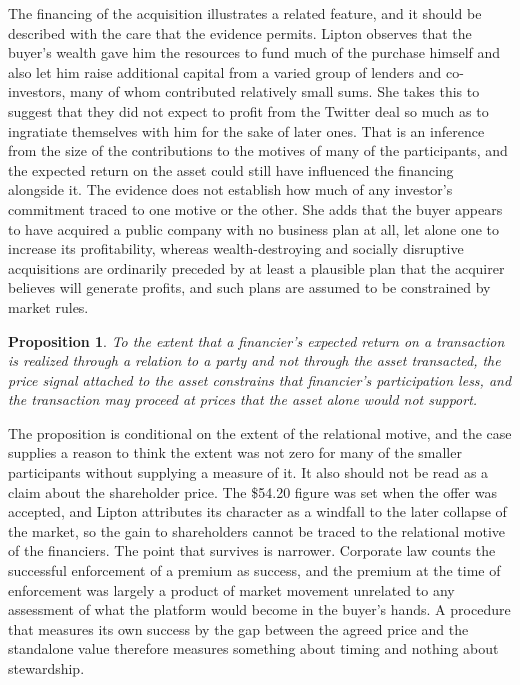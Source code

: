 \documentclass[11pt]{article}
\newtheorem{proposition}{Proposition}
\theoremstyle{definition}
\begin{document}
The financing of the acquisition illustrates a related feature, and it should be described with the care that the evidence permits. Lipton observes that the buyer's wealth gave him the resources to fund much of the purchase himself and also let him raise additional capital from a varied group of lenders and co-investors, many of whom contributed relatively small sums. She takes this to suggest that they did not expect to profit from the Twitter deal so much as to ingratiate themselves with him for the sake of later ones. That is an inference from the size of the contributions to the motives of many of the participants, and the expected return on the asset could still have influenced the financing alongside it. The evidence does not establish how much of any investor's commitment traced to one motive or the other. She adds that the buyer appears to have acquired a public company with no business plan at all, let alone one to increase its profitability, whereas wealth-destroying and socially disruptive acquisitions are ordinarily preceded by at least a plausible plan that the acquirer believes will generate profits, and such plans are assumed to be constrained by market rules.

\begin{proposition}
To the extent that a financier's expected return on a transaction is realized through a relation to a party and not through the asset transacted, the price signal attached to the asset constrains that financier's participation less, and the transaction may proceed at prices that the asset alone would not support.
\end{proposition}

The proposition is conditional on the extent of the relational motive, and the case supplies a reason to think the extent was not zero for many of the smaller participants without supplying a measure of it. It also should not be read as a claim about the shareholder price. The \$54.20 figure was set when the offer was accepted, and Lipton attributes its character as a windfall to the later collapse of the market, so the gain to shareholders cannot be traced to the relational motive of the financiers. The point that survives is narrower. Corporate law counts the successful enforcement of a premium as success, and the premium at the time of enforcement was largely a product of market movement unrelated to any assessment of what the platform would become in the buyer's hands. A procedure that measures its own success by the gap between the agreed price and the standalone value therefore measures something about timing and nothing about stewardship.
\end{document}

